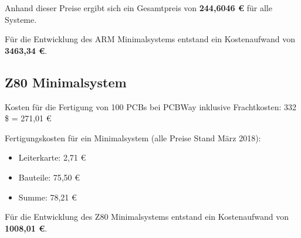 Anhand dieser Preise ergibt sich ein Gesamtpreis von \textbf{244,6046 €} für alle Systeme.

Für die Entwicklung des ARM Minimalsystems entstand ein Kostenaufwand von \textbf{3463,34 €}.

\subsection{Z80 Minimalsystem}
\label{sec:z80-kostenrechnung}
Kosten für die Fertigung von 100 PCBs bei PCBWay inklusive Frachtkosten:
332 \$ = 271,01 €

Fertigungskosten für ein Minimalsystem (alle Preise Stand März 2018):
\begin{itemize}
    \item Leiterkarte: 2,71 €
    \item Bauteile: 75,50 €
    \item Summe: 78,21 €
\end{itemize}

Für die Entwicklung des Z80 Minimalsystems entstand ein Kostenaufwand von \textbf{1008,01 €}.
